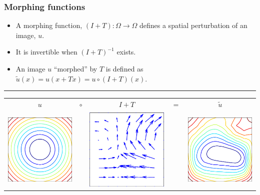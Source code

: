\documentclass{beamer}
\begin{document}
\begin{frame}
\frametitle{Morphing functions}
\begin{itemize}
\item
A \alert{morphing function}, $(I+T):\Omega\rightarrow\Omega$ defines a spatial perturbation of an image, $u$.  
\item
It is \alert{invertible} when $(I+T)^{-1}$ exists.
\item
An image $u$ ``morphed'' by $T$ is defined as $\tilde{u}(x)=u(x+Tx)=u\circ(I+T)(x)$.
\end{itemize}


\rule{\textwidth}{1pt}
\begin{table}[h]
\begin{tabular}{ccccc}
$u$&$\circ$&$I+T$&$=$&$\tilde{u}$\\
\includegraphics[height=1.in]{eps/morphorig}&&
\includegraphics[height=1.in]{eps/morphfun}&&
\includegraphics[height=1.in]{eps/morphtrans}

\end{tabular}
\end{table}
\end{frame}

\end{document}
